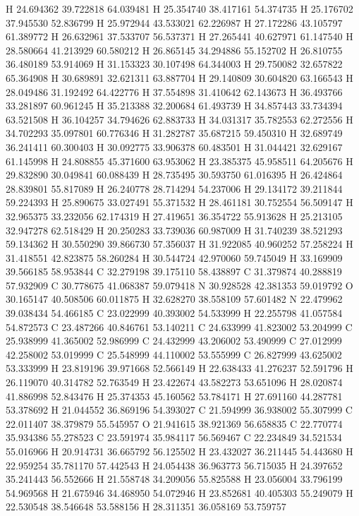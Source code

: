 \documentclass{article}
\begin{document}
H 24.694362 39.722818 64.039481
H 25.354740 38.417161 54.374735
H 25.176702 37.945530 52.836799
H 25.972944 43.533021 62.226987
H 27.172286 43.105797 61.389772
H 26.632961 37.533707 56.537371
H 27.265441 40.627971 61.147540
H 28.580664 41.213929 60.580212
H 26.865145 34.294886 55.152702
H 26.810755 36.480189 53.914069
H 31.153323 30.107498 64.344003
H 29.750082 32.657822 65.364908
H 30.689891 32.621311 63.887704
H 29.140809 30.604820 63.166543
H 28.049486 31.192492 64.422776
H 37.554898 31.410642 62.143673
H 36.493766 33.281897 60.961245
H 35.213388 32.200684 61.493739
H 34.857443 33.734394 63.521508
H 36.104257 34.794626 62.883733
H 34.031317 35.782553 62.272556
H 34.702293 35.097801 60.776346
H 31.282787 35.687215 59.450310
H 32.689749 36.241411 60.300403
H 30.092775 33.906378 60.483501
H 31.044421 32.629167 61.145998
H 24.808855 45.371600 63.953062
H 23.385375 45.958511 64.205676
H 29.832890 30.049841 60.088439
H 28.735495 30.593750 61.016395
H 26.424864 28.839801 55.817089
H 26.240778 28.714294 54.237006
H 29.134172 39.211844 59.224393
H 25.890675 33.027491 55.371532
H 28.461181 30.752554 56.509147
H 32.965375 33.232056 62.174319
H 27.419651 36.354722 55.913628
H 25.213105 32.947278 62.518429
H 20.250283 33.739036 60.987009
H 31.740239 38.521293 59.134362
H 30.550290 39.866730 57.356037
H 31.922085 40.960252 57.258224
H 31.418551 42.823875 58.260284
H 30.544724 42.970060 59.745049
H 33.169909 39.566185 58.953844
C 32.279198 39.175110 58.438897
C 31.379874 40.288819 57.932909
C 30.778675 41.068387 59.079418
N 30.928528 42.381353 59.019792
O 30.165147 40.508506 60.011875
H 32.628270 38.558109 57.601482
N 22.479962 39.038434 54.466185
C 23.022999 40.393002 54.533999
H 22.255798 41.057584 54.872573
C 23.487266 40.846761 53.140211
C 24.633999 41.823002 53.204999
C 25.938999 41.365002 52.986999
C 24.432999 43.206002 53.490999
C 27.012999 42.258002 53.019999
C 25.548999 44.110002 53.555999
C 26.827999 43.625002 53.333999
H 23.819196 39.971668 52.566149
H 22.638433 41.276237 52.591796
H 26.119070 40.314782 52.763549
H 23.422674 43.582273 53.651096
H 28.020874 41.886998 52.843476
H 25.374353 45.160562 53.784171
H 27.691160 44.287781 53.378692
H 21.044552 36.869196 54.393027
C 21.594999 36.938002 55.307999
C 22.011407 38.379879 55.545957
O 21.941615 38.921369 56.658835
C 22.770774 35.934386 55.278523
C 23.591974 35.984117 56.569467
C 22.234849 34.521534 55.016966
H 20.914731 36.665792 56.125502
H 23.432027 36.211445 54.443680
H 22.959254 35.781170 57.442543
H 24.054438 36.963773 56.715035
H 24.397652 35.241443 56.552666
H 21.558748 34.209056 55.825588
H 23.056004 33.796199 54.969568
H 21.675946 34.468950 54.072946
H 23.852681 40.405303 55.249079
H 22.530548 38.546648 53.588156
H 28.311351 36.058169 53.759757
~    
   
\end{document}
